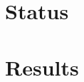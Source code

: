 \documentclass[a4paper]{article}
\begin{document}
\section{Status}

\section{Results}


\newpage


\end{document}
